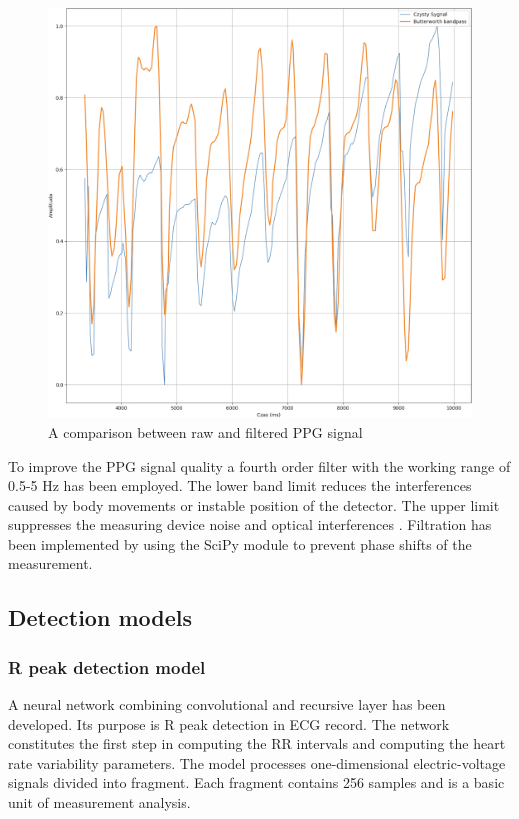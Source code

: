 \documentclass[journal]{IEEEtran}
\begin{document}
{\begin{figure}[htbp]
    \centering
    \includegraphics[width=0.76\linewidth]{Filtr_PPG.png} 
    \caption{A comparison between raw and filtered PPG signal}
    \label{fig:filtr_ppg}
\end{figure}

To improve the PPG signal quality a fourth order filter with the working range of 0.5-5 Hz has been employed. The lower band limit reduces the interferences caused by body movements or instable position of the detector. The upper limit suppresses the measuring device noise and optical interferences \cite{26}. Filtration has been implemented by using the SciPy module to prevent phase shifts of the measurement.

\newpage
\subsection{Detection models}
\subsubsection{R peak detection model}
A neural network combining convolutional and recursive layer has been developed. Its purpose is R peak detection in ECG record. The network constitutes the first step in computing the RR intervals and computing the heart rate variability parameters. The model processes one-dimensional electric-voltage signals divided into fragment. Each fragment contains 256 samples and is a basic unit of measurement analysis.

}
\end{document}

